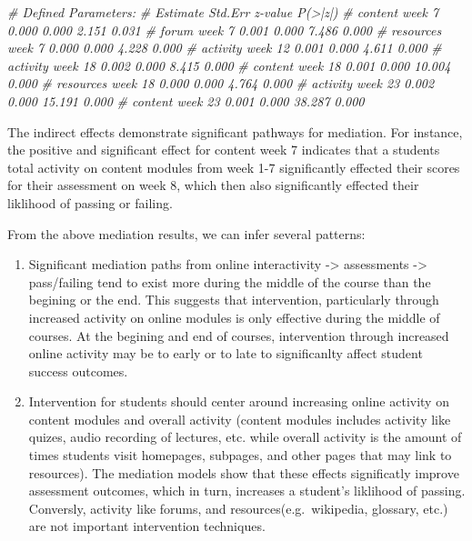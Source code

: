 \documentclass[]{article}
\newenvironment{Shaded}{\begin{snugshade}}{\end{snugshade}}
\newcommand{\CommentTok}[1]{\textcolor[rgb]{0.56,0.35,0.01}{\textit{#1}}}
\providecommand{\tightlist}{%
  \setlength{\itemsep}{0pt}\setlength{\parskip}{0pt}}
\begin{document}
\begin{Shaded}
\begin{Highlighting}[]
\CommentTok{# Defined Parameters:}
\CommentTok{#                        Estimate  Std.Err  z-value  P(>|z|)}
\CommentTok{#     content week 7       0.000    0.000    2.151    0.031}
\CommentTok{#     forum week 7         0.001    0.000    7.486    0.000}
\CommentTok{#     resources week 7     0.000    0.000    4.228    0.000}
\CommentTok{#     activity week 12     0.001    0.000    4.611    0.000}
\CommentTok{#     activity week 18     0.002    0.000    8.415    0.000}
\CommentTok{#     content week 18      0.001    0.000   10.004    0.000}
\CommentTok{#     resources week 18    0.000    0.000    4.764    0.000}
\CommentTok{#     activity week 23     0.002    0.000   15.191    0.000}
\CommentTok{#     content week 23      0.001    0.000   38.287    0.000}
\end{Highlighting}
\end{Shaded}

The indirect effects demonstrate significant pathways for mediation. For
instance, the positive and significant effect for content week 7
indicates that a students total activity on content modules from week
1-7 significantly effected their scores for their assessment on week 8,
which then also significantly effected their liklihood of passing or
failing.

From the above mediation results, we can infer several patterns:

\begin{enumerate}
\def\labelenumi{\arabic{enumi}.}
\tightlist
\item
  Significant mediation paths from online interactivity -\textgreater{}
  assessments -\textgreater{} pass/failing tend to exist more during the
  middle of the course than the begining or the end. This suggests that
  intervention, particularly through increased activity on online
  modules is only effective during the middle of courses. At the
  begining and end of courses, intervention through increased online
  activity may be to early or to late to significanlty affect student
  success outcomes.
\item
  Intervention for students should center around increasing online
  activity on content modules and overall activity (content modules
  includes activity like quizes, audio recording of lectures, etc. while
  overall activity is the amount of times students visit homepages,
  subpages, and other pages that may link to resources). The mediation
  models show that these effects significatly improve assessment
  outcomes, which in turn, increases a student's liklihood of passing.
  Conversly, activity like forums, and resources(e.g.~wikipedia,
  glossary, etc.) are not important intervention techniques.
\end{enumerate}
\end{document}

